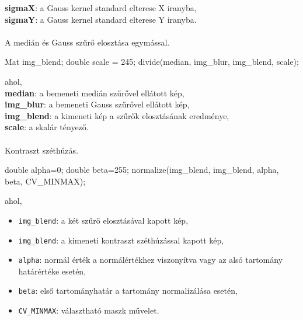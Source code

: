 \indent \textbf{sigmaX}: a Gauss kernel standard elterese X iranyba,\\
\indent \textbf{sigmaY}: a Gauss kernel standard elterese Y iranyba.\\ \\
A medián és Gauss szűrő elosztása egymással.
\begin{cpp}
Mat img_blend;
double scale = 245;
divide(median, img_blur, img_blend, scale);   
\end{cpp}
ahol, \\
\indent \textbf{median}: a bemeneti medián szűrővel ellátott kép,\\
\indent \textbf{img\_blur}: a bemeneti Gauss szűrővel ellátott kép,\\
\indent \textbf{img\_blend}: a kimeneti kép a szűrők elosztásának eredménye,\\
\indent \textbf{scale}: a skalár tényező.\\ \\
Kontraszt széthúzás.
\begin{cpp}
double alpha=0; 
double beta=255;
normalize(img_blend, img_blend, alpha, beta, CV_MINMAX);
\end{cpp}
ahol,
\begin{itemize}
\item \texttt{img\_blend}: a két szűrő elosztásával kapott kép,
\item \texttt{img\_blend}: a kimeneti kontraszt széthúzással kapott kép,
\item \texttt{alpha}: normál érték a normálértékhez viszonyítva vagy az alsó tartomány határértéke esetén,
\item \texttt{beta}: első tartományhatár a tartomány normalizálása esetén,
\item \texttt{CV\_MINMAX}: választható maszk művelet.
\end{itemize}

